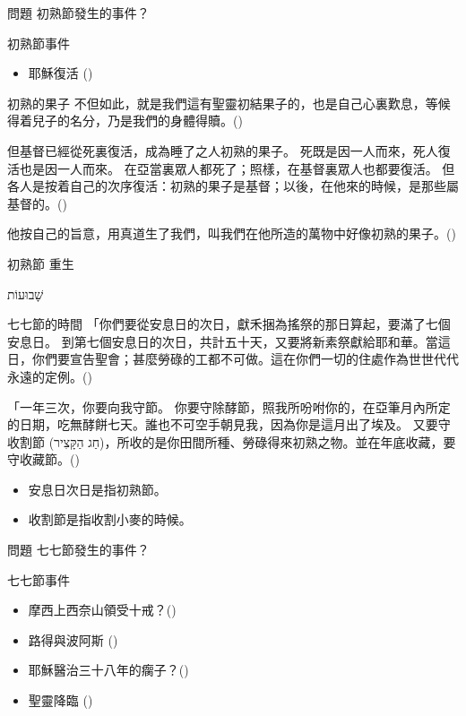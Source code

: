\documentclass{beamer}
\newcommand{\topic}[1]{
  \begin{frame}
    \centering
    \vspace*{1cm}
    {\fontsize{40}{48}\selectfont #1\par}
    \vfill
  \end{frame}
}
\newcommand{\question}[1]{
  \begin{frame}{問題}
    \centering
    \vspace*{1cm}
    \huge #1？\par
    \vfill
  \end{frame}
}
\newcommand{\conclusion}[2]{
  \begin{frame}
    \centering
    \vspace*{1cm}
    {\fontsize{40}{48}\selectfont #1 \textemdash #2\par}
    \vfill
  \end{frame}
}
\newcommand{\parvspace}{\par\vspace{0.5em}}
\begin{document}
\question{初熟節發生的事件}

\begin{frame}{初熟節事件}
  \begin{itemize}
    \item 耶穌復活 ()
  \end{itemize}
\end{frame}

\begin{frame}{初熟的果子}
  不但如此，就是我們這有聖靈\alert{初結果子}的，也是自己心裏歎息，等候得着兒子的名分，乃是我們的身體得贖。()\parvspace
  但基督已經從死裏復活，成為\alert{睡了之人初熟的果子}。 死既是因一人而來，死人復活也是因一人而來。
  在亞當裏眾人都死了；照樣，在基督裏眾人也都要復活。
  但各人是按着自己的次序復活：\alert{初熟的果子是基督}；以後，在他來的時候，是那些屬基督的。()\parvspace
  他按自己的旨意，用真道生了我們，叫我們在他所造的萬物中好像\alert{初熟的果子}。()\parvspace
\end{frame}

\conclusion{初熟節}{重生}

\topic{\texthebrew{שָׁבוּעוֹת}}

\begin{frame}{七七節的時間}
  「你們要從\alert{安息日的次日}，獻禾捆為搖祭的那日算起，要\alert{滿了七個安息日}。
  到\alert{第七個安息日的次日，共計五十天}，又要將新素祭獻給耶和華。\textellipsis{}當這日，你們要宣告聖會；\alert{甚麼勞碌的工都不可做}。這在你們一切的住處作為世世代代永遠的定例。()\parvspace
  「一年三次，你要向我守節。
  你要守除酵節，照我所吩咐你的，在亞筆月內所定的日期，吃無酵餅七天。誰也不可空手朝見我，因為你是這月出了埃及。
  又要守\alert{收割節 (\texthebrew{חַג
  הַקָּצִיר})}，所收的是你田間所種、勞碌得來初熟之物。並在年底收藏，要守收藏節。()\parvspace
  \begin{itemize}
    \item 安息日次日是指初熟節。
    \item 收割節是指收割小麥的時候。
  \end{itemize}
\end{frame}

\question{七七節發生的事件}

\begin{frame}{七七節事件}
  \begin{itemize}
    \item 摩西上西奈山領受十戒？()\parencite{TenCommandmentsOnShavuot}
    \item 路得與波阿斯 ()
    \item 耶穌醫治三十八年的瘸子？()
    \item 聖靈降臨 ()
  \end{itemize}
\end{frame}
\end{document}
